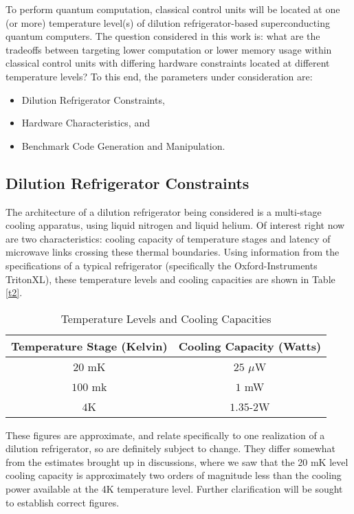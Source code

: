 To perform quantum computation, classical control units will be located at one (or more) temperature level(s) of dilution refrigerator-based superconducting quantum computers. The question considered in this work is: what are the tradeoffs between targeting lower computation or lower memory usage within classical control units with differing hardware constraints located at different temperature levels? To this end, the parameters under consideration are:
\begin{itemize}
	\item Dilution Refrigerator Constraints, 
	\item Hardware Characteristics, and
	\item Benchmark Code Generation and Manipulation. 
\end{itemize}
\subsection*{Dilution Refrigerator Constraints}

The architecture of a dilution refrigerator being considered is a multi-stage cooling apparatus, using liquid nitrogen and liquid helium. Of interest right now are two characteristics: cooling capacity of temperature stages and latency of microwave links crossing these thermal boundaries. Using information from the specifications of a typical refrigerator (specifically the Oxford-Instruments TritonXL), these temperature levels and cooling capacities are shown in Table \ref{t2}.

\begin{table}[h!]
	\centering
    \begin{tabular}{|c|c|}
    \hline
    Temperature Stage (Kelvin) & Cooling Capacity (Watts) \\ \hline
    $20$ mK & $25$ $\mu$W \\ \hline
    $100$ mk & $1$ mW \\ \hline
    $4$K & $1.35$-$2$W \\
    \hline
    \end{tabular}
    \caption{Temperature Levels and Cooling Capacities}\label{t1}
\end{table}

These figures are approximate, and relate specifically to one realization of a dilution refrigerator, so are definitely subject to change. They differ somewhat from the estimates brought up in discussions, where we saw that the 20 mK level cooling capacity is approximately two orders of magnitude less than the cooling power available at the 4K temperature level. Further clarification will be sought to establish correct figures. 

